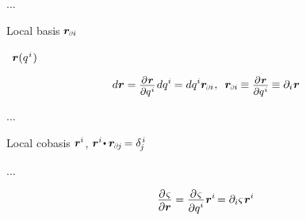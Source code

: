...

Local basis ${\locationvector_\differentialindex{i}}$

 ~${\bm{r}(q^{\hspace{.1ex}i}\hspace{.1ex})}$ 

\nopagebreak\vspace{-0.2em}\begin{equation}\label{differentialoflocationvector}
d\locationvector
=
\scalebox{0.9}{$ \displaystyle\frac{\raisebox{-0.2em}{$ \partial \hspace{.15ex} \locationvector $}}{\partial q^{\hspace{.1ex}i}} $} \hspace{.2ex} dq^i \hspace{-0.1ex}
=
dq^i \locationvector_\differentialindex{i}
\hspace{.1ex} , \hspace{.5em}
\locationvector_\differentialindex{i} \hspace{-0.1ex} \equiv \scalebox{0.9}{$ \displaystyle\frac{\raisebox{-0.2em}{$ \partial \hspace{.15ex} \locationvector $}}{\partial q^{\hspace{.1ex}i}} $} \hspace{-0.1ex}
\equiv \partial_i \hspace{.1ex} \locationvector
\end{equation}

...

Local cobasis ${\bm{r}^i}$, ${\locationvector^i \hspace{-0.32ex} \dotp \locationvector_\differentialindex{\hspace{-0.1ex}j} \hspace{-0.22ex} = \delta_{\hspace{-0.15ex}j}^{\hspace{.2ex}i}}$

...

\begin{equation*}
\displaystyle\frac{\raisebox{-0.2em}{$\partial \hspace{.15ex} \varsigma$}}{\partial \locationvector}
=
\displaystyle\frac{\raisebox{-0.2em}{$\partial \hspace{.15ex} \varsigma$}}{\raisebox{-0.1em}{$\partial q^i$}} \hspace{.1ex} \locationvector^i \hspace{-0.25ex}
=
\partial_i \varsigma \hspace{.2ex} \locationvector^i
\end{equation*}

